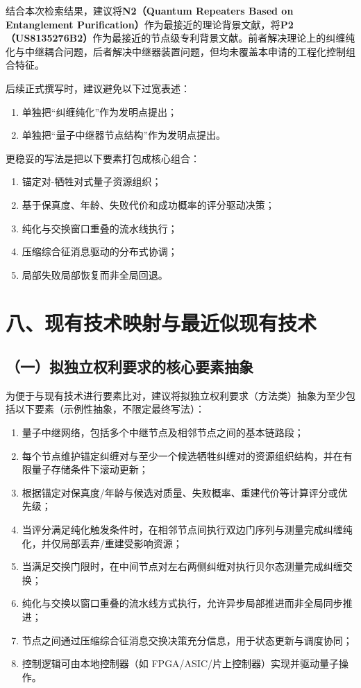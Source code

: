 \documentclass[12pt,a4paper]{article}
\begin{document}
结合本次检索结果，建议将\textbf{N2（Quantum Repeaters Based on Entanglement Purification）}作为最接近的理论背景文献，将\textbf{P2（US8135276B2）}作为最接近的节点级专利背景文献。前者解决理论上的纠缠纯化与中继耦合问题，后者解决中继器装置问题，但均未覆盖本申请的工程化控制组合特征。

后续正式撰写时，建议避免以下过宽表述：
\begin{enumerate}[label=(\arabic*)]
    \item 单独把“纠缠纯化”作为发明点提出；
    \item 单独把“量子中继器节点结构”作为发明点提出。
\end{enumerate}

更稳妥的写法是把以下要素打包成核心组合：
\begin{enumerate}[label=(\arabic*)]
    \item 锚定对-牺牲对式量子资源组织；
    \item 基于保真度、年龄、失败代价和成功概率的评分驱动决策；
    \item 纯化与交换窗口重叠的流水线执行；
    \item 压缩综合征消息驱动的分布式协调；
    \item 局部失败局部恢复而非全局回退。
\end{enumerate}

\section*{八、现有技术映射与最近似现有技术}

\subsection*{（一）拟独立权利要求的核心要素抽象}

为便于与现有技术进行要素比对，建议将拟独立权利要求（方法类）抽象为至少包括以下要素（示例性抽象，不限定最终写法）：
\begin{enumerate}[label=E\arabic*.]
    \item 量子中继网络，包括多个中继节点及相邻节点之间的基本链路段；
    \item 每个节点维护锚定纠缠对与至少一个候选牺牲纠缠对的资源组织结构，并在有限量子存储条件下滚动更新；
    \item 根据锚定对保真度/年龄与候选对质量、失败概率、重建代价等计算评分或优先级；
    \item 当评分满足纯化触发条件时，在相邻节点间执行双边门序列与测量完成纠缠纯化，并仅局部丢弃/重建受影响资源；
    \item 当满足交换门限时，在中间节点对左右两侧纠缠对执行贝尔态测量完成纠缠交换；
    \item 纯化与交换以窗口重叠的流水线方式执行，允许异步局部推进而非全局同步推进；
    \item 节点之间通过压缩综合征消息交换决策充分信息，用于状态更新与调度协同；
    \item 控制逻辑可由本地控制器（如 FPGA/ASIC/片上控制器）实现并驱动量子操作。
\end{enumerate}
\end{document}
